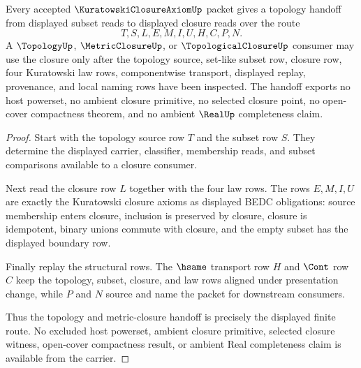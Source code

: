 \begin{theorem}
\label{thm:kuratowski-closure-axiom-topology-handoff}
Every accepted $\KuratowskiClosureAxiomUp$ packet gives a topology handoff from displayed subset reads to displayed closure reads over the route
$$
T,S,L,E,M,I,U,H,C,P,N .
$$
A $\TopologyUp$, $\MetricClosureUp$, or $\TopologicalClosureUp$ consumer may use the closure only after the topology source, set-like subset row, closure row, four Kuratowski law rows, componentwise transport, displayed replay, provenance, and local naming rows have been inspected. The handoff exports no host powerset, no ambient closure primitive, no selected closure point, no open-cover compactness theorem, and no ambient $\RealUp$ completeness claim.
\end{theorem}
\begin{proof}
Start with the topology source row $T$ and the subset row $S$. They determine the displayed carrier, classifier, membership reads, and subset comparisons available to a closure consumer.

Next read the closure row $L$ together with the four law rows. The rows $E,M,I,U$ are exactly the Kuratowski closure axioms as displayed BEDC obligations: source membership enters closure, inclusion is preserved by closure, closure is idempotent, binary unions commute with closure, and the empty subset has the displayed boundary row.

Finally replay the structural rows. The $\hsame$ transport row $H$ and $\Cont$ row $C$ keep the topology, subset, closure, and law rows aligned under presentation change, while $P$ and $N$ source and name the packet for downstream consumers.

Thus the topology and metric-closure handoff is precisely the displayed finite route. No excluded host powerset, ambient closure primitive, selected closure witness, open-cover compactness result, or ambient Real completeness claim is available from the carrier.
\end{proof}



